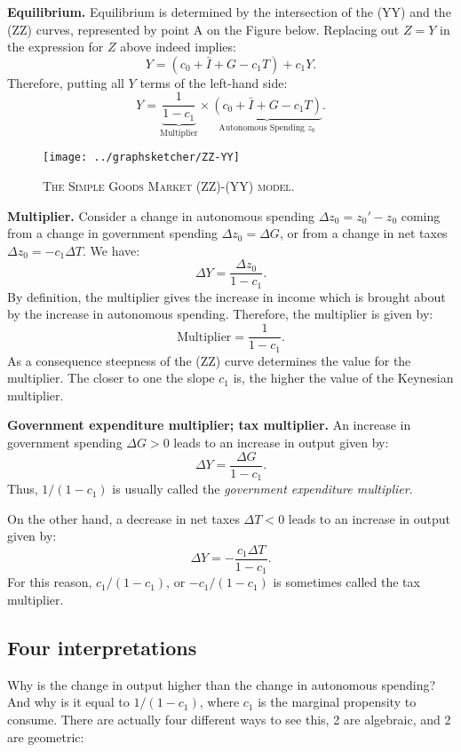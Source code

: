 \documentclass[]{book}
\theoremstyle{definition}
\theoremstyle{definition}
\theoremstyle{definition}
\theoremstyle{remark}
\begin{document}
\textbf{Equilibrium.} Equilibrium is determined by the intersection of
the (YY) and the (ZZ) curves, represented by point A on the Figure
below. Replacing out \(Z=Y\) in the expression for \(Z\) above indeed
implies: \[Y=\left(c_{0}+\bar{I}+G-c_{1}T\right)+c_{1}Y.\] Therefore,
putting all \(Y\) terms of the left-hand side:
\[Y=\underbrace{\frac{1}{1-c_{1}}}_{\text{Multiplier}}\times\underbrace{\left(c_{0}+\bar{I}+G-c_{1}T\right)}_{\text{Autonomous Spending }z_{0}}.\]



\begin{figure}

{\centering \texttt{[image: ../graphsketcher/ZZ-YY]} 

}

\caption{\textsc{The Simple Goods Market (ZZ)-(YY) model}.}\label{fig:zz-yy}
\end{figure}

\textbf{Multiplier.} Consider a change in autonomous spending
\(\Delta z_{0}=z_{0}'-z_{0}\) coming from a change in government
spending \(\Delta z_{0}=\Delta G\), or from a change in net taxes
\(\Delta z_{0}=-c_{1}\Delta T\). We have:
\[\Delta Y=\frac{\Delta z_{0}}{1-c_{1}}.\] By definition, the multiplier
gives the increase in income which is brought about by the increase in
autonomous spending. Therefore, the multiplier is given by:
\[\text{Multiplier}=\frac{1}{1-c_{1}}.\] As a consequence steepness of
the (ZZ) curve determines the value for the multiplier. The closer to
one the slope \(c_1\) is, the higher the value of the Keynesian
multiplier.

\textbf{Government expenditure multiplier; tax multiplier.} An increase
in government spending \(\Delta G>0\) leads to an increase in output
given by: \[\Delta Y=\frac{\Delta G}{1-c_{1}}.\] Thus, \(1/(1-c_1)\) is
usually called the \emph{government expenditure multiplier}.

On the other hand, a decrease in net taxes \(\Delta T<0\) leads to an
increase in output given by:
\[\Delta Y = - \frac{c_1 \Delta T}{1-c_{1}}.\] For this reason,
\(c_1/(1-c_1)\), or \(-c_1/(1-c_1)\) is sometimes called the tax
multiplier.

\subsection{Four interpretations}\label{four-interpretations}

Why is the change in output higher than the change in autonomous
spending? And why is it equal to \(1/(1-c_1)\), where \(c_1\) is the
marginal propensity to consume. There are actually four different ways
to see this, 2 are algebraic, and 2 are geometric:
\end{document}
